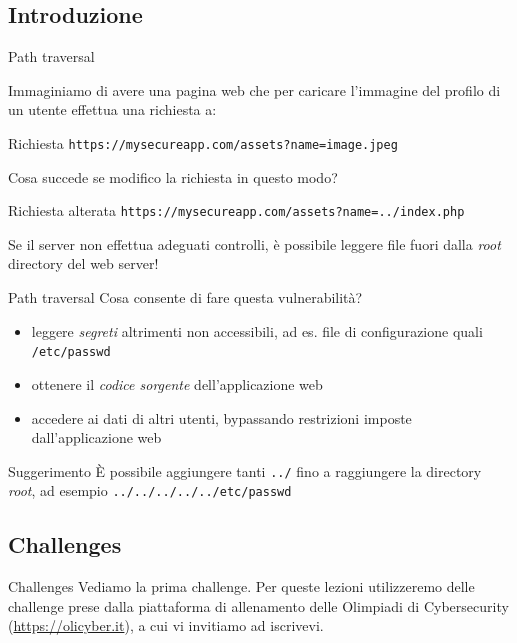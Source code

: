 \documentclass[12pt]{beamer}
\begin{document}
\subsection{Introduzione}
\begin{frame}{Path traversal}

Immaginiamo di avere una pagina web che per caricare l'immagine del profilo di un utente effettua una richiesta a:

\begin{exampleblock}{Richiesta}
\texttt{https://mysecureapp.com/assets?name=image.jpeg}
\end{exampleblock}

\pause
\vfill
Cosa succede se modifico la richiesta in questo modo?

\begin{exampleblock}{Richiesta alterata}
\texttt{https://mysecureapp.com/assets?name=../index.php}
\end{exampleblock}
    
\pause

Se il server non effettua adeguati controlli, è possibile leggere file fuori dalla \textit{root} directory del web server!

\end{frame}
\begin{frame}{Path traversal}
Cosa consente di fare questa vulnerabilità?
\vfill
\pause
\begin{itemize}
    \item leggere \textit{segreti} altrimenti non accessibili, ad es. file di configurazione quali \texttt{/etc/passwd}
    \pause
    \item ottenere il \textit{codice sorgente} dell'applicazione web
    \pause
    \item accedere ai dati di altri utenti, bypassando restrizioni imposte dall'applicazione web
    \pause
\end{itemize}

\vfill
\begin{block}{Suggerimento}
È possibile aggiungere tanti \texttt{../} fino a raggiungere la directory \textit{root}, ad esempio \texttt{../../../../../etc/passwd}
\end{block}

\end{frame}
\subsection{Challenges}
\begin{frame}{Challenges}
Vediamo la prima challenge. Per queste lezioni utilizzeremo delle challenge 
prese dalla piattaforma di allenamento delle Olimpiadi di Cybersecurity (\url{https://olicyber.it}), 
a cui vi invitiamo ad iscrivevi.
\end{frame}
\end{document}
